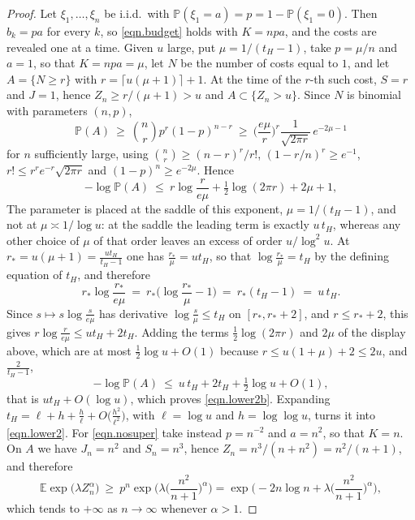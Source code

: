 \documentclass[12pt,oneside,reqno,fleqn]{amsart}
\numberwithin{equation}{section}
\theoremstyle{remark}
\newcommand\mE{{\mathbb E}}
\newcommand\E{\mE}
\newcommand\PP{{\mathbb P}}
\newcommand{\1}{{\mathbf 1}}
\renewcommand{\le}{\leq}
\renewcommand{\ge}{\geq}
\begin{document}
	\begin{proof}
		Let $\xi_1,\dots,\xi_n$ be i.i.d.\ with $\PP(\xi_1=a)=p=1-\PP(\xi_1=0)$. Then $b_k=pa$ for every $k$, so \eqref{eqn.budget} holds with $K=npa$, and the costs are revealed one at a time. Given $u$ large, put $\mu=1/(t_H-1)$, take $p=\mu/n$ and $a=1$, so that $K=npa=\mu$, let $N$ be the number of costs equal to $1$, and let $A=\{N\ge r\}$ with $r=\lceil u(\mu+1)\rceil+1$. At the time of the $r$-th such cost, $S=r$ and $J=1$, hence $Z_n\ge r/(\mu+1)>u$ and $A\subset\{Z_n>u\}$. Since $N$ is binomial with parameters $(n,p)$,
		\[
			\PP(A)\ \ge\ \binom nr p^r(1-p)^{n-r}\ \ge\ \Big(\frac{e\mu}{r}\Big)^r\frac{1}{\sqrt{2\pi r}}\,e^{-2\mu-1}
		\]
for $n$ sufficiently large, using $\binom nr\ge(n-r)^r/r!$, $(1-r/n)^r\ge e^{-1}$, $r!\le r^re^{-r}\sqrt{2\pi r}$ and $(1-p)^n\ge e^{-2\mu}$. Hence
		\[
			-\log\PP(A)\ \le\ r\log\frac{r}{e\mu}+\tfrac12\log(2\pi r)+2\mu+1,
		\]
		The parameter is placed at the saddle of this exponent, $\mu=1/(t_H-1)$, and not at $\mu\asymp1/\log u$: at the saddle the leading term is exactly $u\,t_H$, whereas any other choice of $\mu$ of that order leaves an excess of order $u/\log^2u$. At $r_*=u(\mu+1)=\frac{ut_H}{t_H-1}$ one has $\frac{r_*}{\mu}=ut_H$, so that $\log\frac{r_*}{\mu}=t_H$ by the defining equation of $t_H$, and therefore
		\[
			r_*\log\frac{r_*}{e\mu}\ =\ r_*\Big(\log\frac{r_*}{\mu}-1\Big)\ =\ r_*(t_H-1)\ =\ u\,t_H .
		\]
		Since $s\mapsto s\log\frac{s}{e\mu}$ has derivative $\log\frac{s}{\mu}\le t_H$ on $[r_*,r_*+2]$, and $r\le r_*+2$, this gives $r\log\frac{r}{e\mu}\le ut_H+2t_H$. Adding the terms $\frac12\log(2\pi r)$ and $2\mu$ of the display above, which are at most $\frac12\log u+O(1)$ because $r\le u(1+\mu)+2\le2u$, and $\frac2{t_H-1}$,
		\[
			-\log\PP(A)\ \le\ u\,t_H+2t_H+\tfrac12\log u+O(1),
		\]
		that is $ut_H+O(\log u)$, which proves \eqref{eqn.lower2b}. Expanding $t_H=\ell+h+\frac h\ell+O\big(\frac{h^2}{\ell^2}\big)$, with $\ell=\log u$ and $h=\log\log u$, turns it into \eqref{eqn.lower2}.
		For \eqref{eqn.nosuper} take instead $p=n^{-2}$ and $a=n^2$, so that $K=n$. On $A$ we have $J_n=n^2$ and $S_n=n^3$, hence $Z_n=n^3/(n+n^2)=n^2/(n+1)$, and therefore
		\[
			\E\exp\big(\lambda Z_n^\alpha\big)\ \ge\ p^n\exp\Big(\lambda\Big(\frac{n^2}{n+1}\Big)^\alpha\Big)
			=\exp\Big(-2n\log n+\lambda\Big(\frac{n^2}{n+1}\Big)^\alpha\Big),
		\]
		which tends to $+\infty$ as $n\to\infty$ whenever $\alpha>1$.
	\end{proof}
\end{document}
